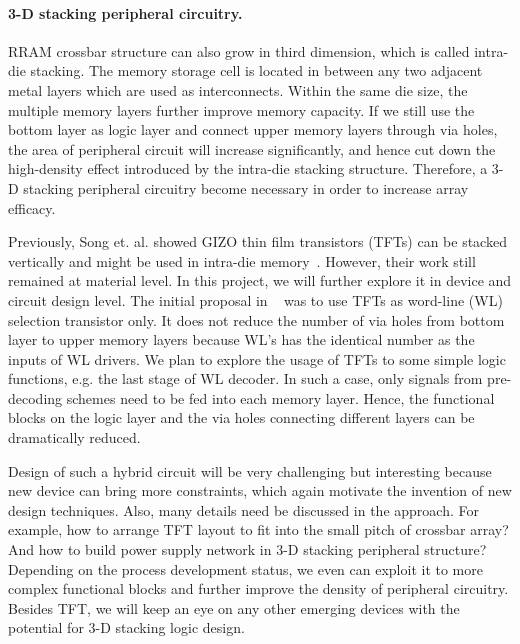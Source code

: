 \paragraph{3-D stacking peripheral circuitry.}
RRAM crossbar structure can also grow in third dimension, which is called intra-die stacking. The memory storage cell is located in between any two adjacent metal layers which are used as interconnects. Within the same die size, the multiple memory layers further improve memory capacity. If we still use the bottom layer as logic layer and connect upper memory layers through via holes, the area of  peripheral circuit will increase significantly, and hence cut down the high-density effect introduced by the intra-die stacking structure. Therefore, a 3-D stacking peripheral circuitry become necessary in order to increase array efficacy.

Previously, Song et. al. showed GIZO thin film transistors (TFTs) can be stacked vertically and might be used in intra-die memory~\cite{Song08}. However, their work still remained at material level. In this project, we will further explore it in device and circuit design level. The initial proposal in ~\cite{Song08} was to use TFTs as word-line (WL) selection transistor only. It does not reduce the number of via holes from bottom layer to upper memory layers because WL's has the identical number as the inputs of WL drivers. We plan to explore the usage of TFTs to some simple logic functions, e.g. the last stage of WL decoder. In such a case, only signals from pre-decoding schemes need to be fed into each memory layer. Hence, the functional blocks on the logic layer and the via holes connecting different layers can be dramatically reduced.

Design of such a hybrid circuit will be very challenging but interesting because new device can bring more constraints, which again motivate the invention of new design techniques. Also, many details need be discussed in the approach. For example, how to arrange TFT layout to fit into the small pitch of crossbar array? And how to build power supply network in 3-D stacking peripheral structure? Depending on the process development status, we even can exploit it to more complex functional blocks and further improve the density of peripheral circuitry. Besides TFT, we will keep an eye on any other emerging devices with the potential for 3-D stacking logic design.


